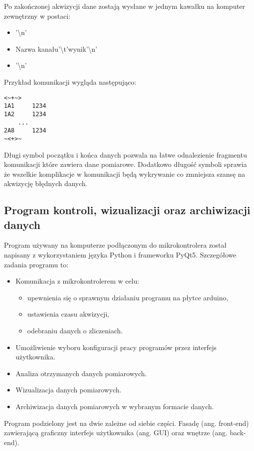 Po zakończonej akwizycji dane zostają wysłane w jednym kawałku na komputer zewnętrzny w postaci:
\begin{itemize}
        \item \detokenize{<~+~>}'\textbackslash n'
        \item {Nazwa kanału}'\textbackslash t'{wynik}'\textbackslash n'
        \item \detokenize{~<+>~}'\textbackslash n'
\end{itemize}
Przykład komunikacji wygląda następująco:
\begin{lstlisting}
<~+~>
1A1     1234
1A2     1234 
    ...
2A8     1234
~<+>~
\end{lstlisting}

Długi symbol początku i końca danych pozwala na łatwe odnalezienie fragmentu komunikacji które zawiera dane pomiarowe. Dodatkowo długość symboli sprawia że wszelkie komplikacje w komunikacji będą wykrywanie co zmniejsza szansę na akwizycję błędnych danych. 

\subsection{Program kontroli, wizualizacji oraz archiwizacji danych}

Program używany na komputerze podłączonym do mikrokontrolera został napisany z wykorzystaniem języka Python i frameworku PyQt5.
Szczegółowe zadania programu to:
\begin{itemize}
        \item Komunikacja z mikrokontrolerem w celu:
        \begin{itemize}
                \item upewnienia się o sprawnym działaniu programu na płytce arduino,
                \item ustawienia czasu akwizycji,
                \item odebraniu danych o zliczeniach. 
        \end{itemize}
        \item Umożliwienie wyboru konfiguracji pracy programów przez interfejs użytkownika.
        \item Analiza otrzymanych danych pomiarowych.
        \item Wizualizacja danych pomiarowych.
        \item Archiwizacja danych pomiarowych w wybranym formacie danych.
\end{itemize}

Program podzielony jest na dwie zależne od siebie części. Fasadę (ang. front-end) zawierającą graficzny interfejs użytkownika (ang. GUI) oraz wnętrze (ang. back-end).

